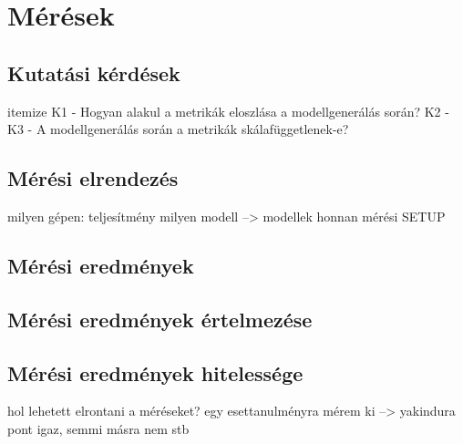 \chapter{Mérések}

\section{Kutatási kérdések}
itemize
K1 - Hogyan alakul a metrikák eloszlása a modellgenerálás során? 
K2 - 
K3 - A modellgenerálás során a metrikák skálafüggetlenek-e?




\section{Mérési elrendezés}
milyen gépen: teljesítmény 
milyen modell --> modellek honnan 
mérési SETUP


\section{Mérési eredmények}

\section{Mérési eredmények értelmezése}

\section{Mérési eredmények hitelessége}
hol lehetett elrontani a méréseket?
egy esettanulményra mérem ki --> yakindura pont igaz, semmi másra nem
stb

